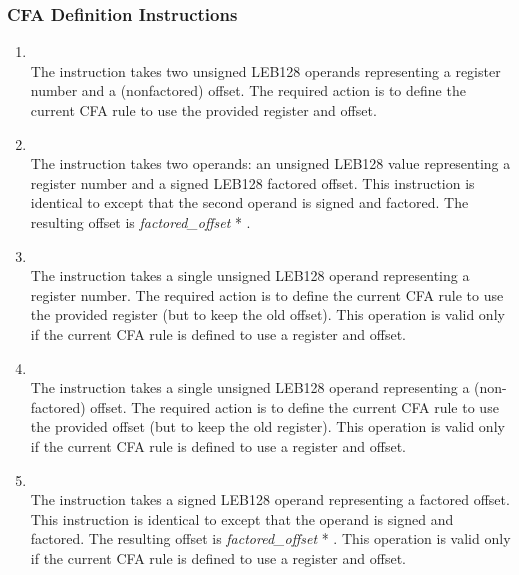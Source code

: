 \label{chap:cfadefinitioninstructions}
\subsubsection{CFA Definition Instructions}
\begin{enumerate}[1. ]

\item \textbf{\DWCFAdefcfaTARG} \\
The \DWCFAdefcfaTARG{}
instruction takes two unsigned LEB128
operands representing a register number and a (non\dash factored)
offset. The required action is to define the current CFA rule
to use the provided register and offset.

\item \textbf{\DWCFAdefcfasfTARG} \\
The \DWCFAdefcfasfTARG{} instruction takes two operands:
an unsigned LEB128 value
representing a register number and a
signed LEB128 factored offset. This instruction is identical
to \DWCFAdefcfa{} except that the second operand is signed
and factored. The resulting offset is \textit{factored\_offset} *
.


\item \textbf{\DWCFAdefcfaregisterTARG} \\
The \DWCFAdefcfaregisterTARG{} 
instruction takes a single
unsigned LEB128 operand representing a register number. The
required action is to define the current CFA rule to use
the provided register (but to keep the old offset). This
operation is valid only if the current CFA rule is defined
to use a register and offset.


\item \textbf{\DWCFAdefcfaoffsetTARG} \\
The \DWCFAdefcfaoffsetTARG{} instruction takes a single
unsigned LEB128 operand representing a (non-factored)
offset. The required action is to define the current CFA rule
to use the provided offset (but to keep the old register). This
operation is valid only if the current CFA rule is defined
to use a register and offset.


\item \textbf{\DWCFAdefcfaoffsetsfTARG} \\
The \DWCFAdefcfaoffsetsfTARG{} instruction takes a signed
LEB128 operand representing a factored offset. This instruction
is identical to \DWCFAdefcfaoffset{} except that the
operand is signed and factored. The resulting offset is
\textit{factored\_offset} * .
This operation
is valid only if the current CFA rule is defined to use a
register and offset.


\end{enumerate}
